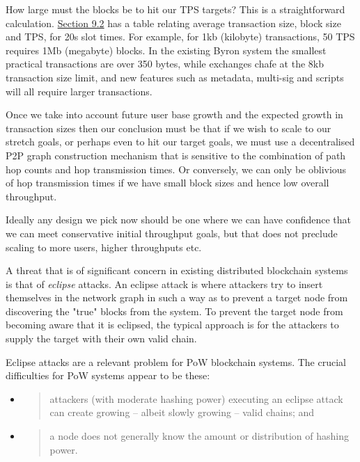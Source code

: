 \documentclass[11pt,a4paper]{article}
\begin{document}
How large must the blocks be to hit our TPS targets? This is a
straightforward calculation.
\protect\hyperlink{fundamental-tradeoffs}{{Section 9.2}} has a table
relating average transaction size, block size and TPS, for 20s slot
times. For example, for 1kb (kilobyte) transactions, 50 TPS requires 1Mb
(megabyte) blocks. In the existing Byron system the smallest practical
transactions are over 350 bytes, while exchanges chafe at the 8kb
transaction size limit, and new features such as metadata, multi-sig and
scripts will all require larger transactions.

Once we take into account future user base growth and the expected
growth in transaction sizes then our conclusion must be that if we wish
to scale to our stretch goals, or perhaps even to hit our target goals,
we must use a decentralised P2P graph construction mechanism that is
sensitive to the combination of path hop counts and hop transmission
times. Or conversely, we can only be oblivious of hop transmission times
if we have small block sizes and hence low overall throughput.

Ideally any design we pick now should be one where we can have
confidence that we can meet conservative initial throughput goals, but
that does not preclude scaling to more users, higher throughputs etc.

A threat that is of significant concern in existing distributed
blockchain systems is that of \emph{eclipse} attacks. An eclipse attack
is where attackers try to insert themselves in the network graph in such
a way as to prevent a target node from discovering the "true" blocks
from the system. To prevent the target node from becoming aware that it
is eclipsed, the typical approach is for the attackers to supply the
target with their own valid chain.

Eclipse attacks are a relevant problem for PoW blockchain systems. The
crucial difficulties for PoW systems appear to be these:

\begin{itemize}
\item
  \begin{quote}
  attackers (with moderate hashing power) executing an eclipse attack
  can create growing -- albeit slowly growing -- valid chains; and
  \end{quote}
\item
  \begin{quote}
  a node does not generally know the amount or distribution of hashing
  power.
  \end{quote}
\end{itemize}
\end{document}

